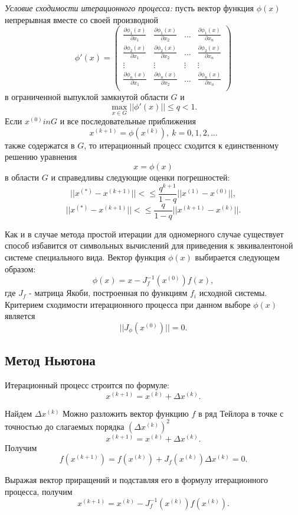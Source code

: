 \documentclass[a4paper,12pt]{article}
\begin{document}
\textit{Условие сходимости итерационного процесса:} пусть вектор функция
$\phi(x)$ непрерывная вместе со своей производной
$$
\phi'(x) =
\begin{pmatrix}
    \frac{\partial \phi_1(x)}{\partial x_1} & \frac{\partial \phi_1(x)}{\partial x_2}
    & \ldots & \frac{\partial \phi_1(x)}{\partial x_n} \\
    \frac{\partial \phi_2(x)}{\partial x_1} & \frac{\partial \phi_2(x)}{\partial x_2}
    & \ldots & \frac{\partial \phi_2(x)}{\partial x_n} \\
    \vdots & \vdots & \vdots & \vdots \\
    \frac{\partial \phi_n(x)}{\partial x_1} & \frac{\partial \phi_n(x)}{\partial x_2}
    & \ldots & \frac{\partial \phi_n(x)}{\partial x_n} \\
\end{pmatrix}
$$
в ограниченной выпуклой замкнутой области $G$ и
$$
\underset{x \in G}{\max} ||\phi'(x)|| \leq q < 1.
$$
Если $x^{(0)} in G$ и все последовательные приближения
$$
x^{(k + 1)} = \phi(x^{(k)}),\ k = 0, 1, 2, \ldots
$$
также содержатся в $G$, то итерационный процесс сходится
к единственному решению уравнения
$$
x = \phi(x)
$$
в области $G$ и справедливы следующие оценки погрешностей:
$$
||x^{(*)} - x^{(k + 1)}|| < \leq \frac{q^{k + 1}}{1 - q} ||x^{(1)} - x^{(0)}||,
$$
$$
||x^{(*)} - x^{(k + 1)}|| < \leq \frac{q}{1 - q} ||x^{(k + 1)} - x^{(k)}||.
$$

Как и в случае метода простой итерации для одномерного случае существует способ
избавится от символьных вычислений для приведения к эвкивалентоной
системе специального вида. Вектор функция $\phi(x)$ выбирается следующем образом:
$$
\phi(x) = x - J_f^{-1}(x^{(0)}) f(x),
$$
где $J_f$ - матрица Якоби, построенная по функциям $f_i$ исходной системы.
Критерием сходимости итерационного процесса при данном выборе $\phi(x)$
является
$$
||J_{\phi}(x^{(0)})|| = 0.
$$

\subsection{Метод Ньютона}
Итерационный процесс строится по формуле:
$$
x^{(k + 1)} = x^{(k)} + \Delta x^{(k)}.
$$

Найдем $\Delta x^{(k)}$
Можно разложить вектор функцию $f$ в ряд Тейлора в точке
с точностью до слагаемых порядка $(\Delta x^{(k)})^2$
$$
x^{(k + 1)} = x^{(k)} + \Delta x^{(k)}.
$$
Получим
$$
f(x^{(k + 1)}) = f(x^{(k)}) + J_f(x^{(k)}) \Delta x^{(k)} = 0.
$$

Выражая вектор приращений и подставляя его в формулу итерационного
процесса, получим
$$
x^{(k + 1)} = x^{(k)} - J_f^{-1}(x^{(k)}) f(x^{(k)}).
$$
\end{document}

